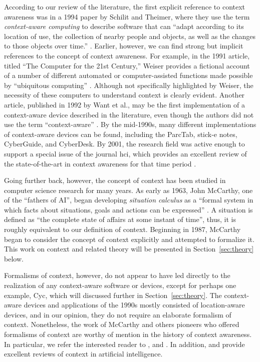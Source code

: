 According to our review of the literature, the first explicit reference to context awareness was in a 1994 paper by Schilit and Theimer, where they use the term \emph{context-aware computing} to describe software that can ``adapt according to its location of use, the collection of nearby people and objects, as well as the changes to those objects over time.'' \cite{schilit1994disseminating}. Earlier, however, we can find strong but implicit references to the concept of context awareness. For example, in the 1991 article, titled ``The Computer for the 21st Century,'' Weiser provides a fictional account of a number of different automated or computer-assisted functions made possible by ``ubiquitous computing'' \cite{weiser1991computer}. Although not specifically highlighted by Weiser, the necessity of these computers to understand context is clearly evident. Another article, published in 1992 by Want et al., may be the first implementation of a context-aware device described in the literature, even though the authors did not use the term ``context-aware'' \cite{want1992active}. By the mid-1990s, many different implementations of context-aware devices can be found, including the ParcTab, stick-e notes, CyberGuide, and CyberDesk. By 2001, the research field was active enough to support a special issue of the journal \gls{hci}, which provides an excellent review of the state-of-the-art in context awareness for that time period \cite{moran2001introduction}.

Going further back, however, the concept of context has been studied in computer science research for many years. As early as 1963, John McCarthy, one of the ``fathers of AI'', began developing \emph{situation calculus} as a ``formal system in which facts about situations, goals and actions can be expressed'' \cite{mccarthy1963programs}. A situation is defined as ``the complete state of affairs at some instant of time'', thus, it is roughly equivalent to our definition of context. Beginning in 1987, McCarthy began to consider the concept of context explicitly and attempted to formalize it. This work on context and related theory will be presented in Section~\ref{sec:theory} below.

Formalisms of context, however, do not appear to have led directly to the realization of any context-aware software or devices, except for perhaps one example, Cyc, which will discussed further in Section~\ref{sec:theory}. The context-aware devices and applications of the 1990s mostly consisted of location-aware devices, and in our opinion, they do not require an elaborate formalism of context. Nonetheless, the work of McCarthy and others pioneers who offered formalisms of context are worthy of mention in the history of context awareness. In particular, we refer the interested reader to \cite{McCarthy1993} \cite{guha1991contexts} \cite{mccarthy1997formalizing} \cite{akman1996steps}, and \cite{buvac1993propositional}. In addition, \cite{brezillon1999context} and \cite{akman2002context} provide excellent reviews of context in artificial intelligence.

